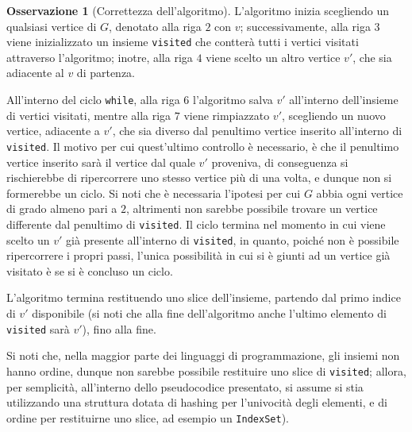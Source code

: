 \documentclass[14pt]{extreport}
\theoremstyle{definition}
\theoremstyle{definition}
\newtheorem{remark}{Osservazione}[subsection]
\begin{document}
\begin{remark}[Correttezza dell'algoritmo]
    L'algoritmo inizia scegliendo un qualsiasi vertice di $G$, denotato alla riga $2$ con $v$; successivamente, alla riga $3$ viene inizializzato un insieme \texttt{visited} che contterà tutti i vertici visitati attraverso l'algoritmo; inotre, alla riga $4$ viene scelto un altro vertice $v'$, che sia adiacente al $v$ di partenza.

    All'interno del ciclo \texttt{while}, alla riga $6$ l'algoritmo salva $v'$ all'interno dell'insieme di vertici visitati, mentre alla riga $7$ viene rimpiazzato $v'$, scegliendo un nuovo vertice, adiacente a $v'$, che sia diverso dal penultimo vertice inserito all'interno di \texttt{visited}. Il motivo per cui quest'ultimo controllo è necessario, è che il penultimo vertice inserito sarà il vertice dal quale $v'$ proveniva, di conseguenza si rischierebbe di ripercorrere uno stesso vertice più di una volta, e dunque non si formerebbe un ciclo. Si noti che è necessaria l'ipotesi per cui $G$ abbia ogni vertice di grado almeno pari a $2$, altrimenti non sarebbe possibile trovare un vertice differente dal penultimo di \texttt{visited}. Il ciclo termina nel momento in cui viene scelto un $v'$ già presente all'interno di \texttt{visited}, in quanto, poiché non è possibile ripercorrere i propri passi, l'unica possibilità in cui si è giunti ad un vertice già visitato è se si è concluso un ciclo.
    
    L'algoritmo termina restituendo uno slice dell'insieme, partendo dal primo indice di $v'$ disponibile (si noti che alla fine dell'algoritmo anche l'ultimo elemento di \texttt{visited} sarà $v'$), fino alla fine.

    Si noti che, nella maggior parte dei linguaggi di programmazione, gli insiemi non hanno ordine, dunque non sarebbe possibile restituire uno slice di \texttt{visited}; allora, per semplicità, all'interno dello pseudocodice presentato, si assume si stia utilizzando una struttura dotata di hashing per l'univocità degli elementi, e di ordine per restituirne uno slice, ad esempio un \texttt{IndexSet}).
\end{remark}
\end{document}
